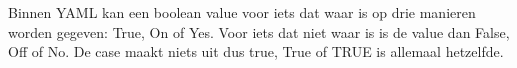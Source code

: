 Binnen YAML kan een boolean value voor iets dat waar is op drie manieren worden gegeven: True, On of Yes. Voor iets dat niet waar is is de value dan False, Off of No. De case maakt niets uit dus true, True of TRUE is allemaal hetzelfde.


